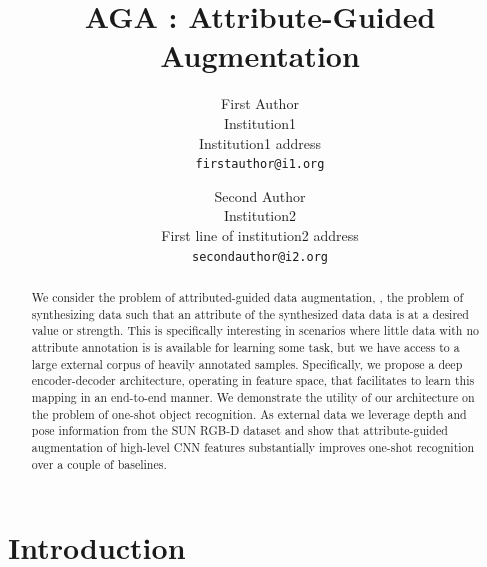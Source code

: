 \documentclass[10pt,twocolumn,letterpaper]{article}
\begin{document}
\title{AGA : Attribute-Guided Augmentation}

\author{First Author\\
Institution1\\
Institution1 address\\
{\tt\small firstauthor@i1.org}
\and
Second Author\\
Institution2\\
First line of institution2 address\\
{\tt\small secondauthor@i2.org}
}

\maketitle

\begin{abstract}
We consider the problem of attributed-guided data augmentation, \ie,
the problem of synthesizing data such that an attribute of the synthesized 
data data is at a desired value or strength. This is specifically interesting
in scenarios where little data with no attribute annotation is 
is available for learning some task, but we have access to a large 
external corpus of heavily annotated samples. 
Specifically, we propose a deep encoder-decoder architecture, operating
in feature space, that facilitates to learn this mapping in 
an end-to-end manner. We demonstrate the utility of 
our architecture on the problem of one-shot object recognition.
As external data we leverage depth and pose information from the 
SUN RGB-D dataset and show that attribute-guided augmentation of
high-level CNN features substantially improves one-shot recognition over 
a couple of baselines.
\end{abstract}

\section{Introduction}
\label{section:introduction}
\end{document}

